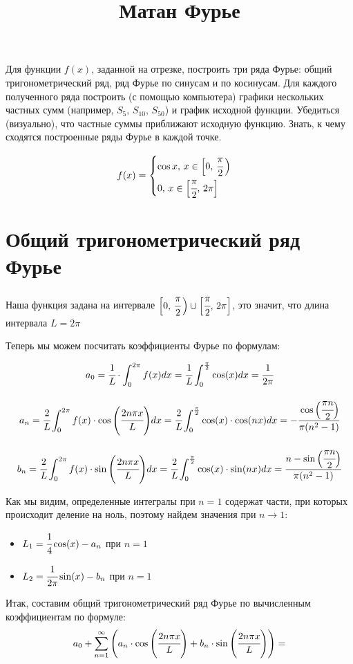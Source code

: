 \documentclass{article}
\title{Матан Фурье}
\begin{document}
\maketitle 
Для функции $f (x)$, заданной на отрезке, построить три ряда Фурье: общий тригонометрический ряд, ряд Фурье по синусам и по косинусам. Для каждого полученного ряда построить (с помощью компьютера) графики нескольких частных сумм (например, $S_5,\,S_{10},\,S_{50}$) и график исходной функции. Убедиться (визуально), что частные суммы приближают исходную функцию. Знать, к чему сходятся построенные ряды Фурье в каждой точке.

$$f(x)=\begin{cases} \cos x,\,x\in \Big[ 0,\,\cfrac{\pi}{2}\,\Big) \\ 0,\,x\in \Big[\cfrac{\pi}{2},\,2\pi\Big] \end{cases}
$$
\tableofcontents
\newpage
\section{Общий тригонометрический ряд Фурье}
Наша функция задана на интервале $\Big[ 0,\,\cfrac{\pi}{2}\,\Big) \cup \Big[\cfrac{\pi}{2},\,2\pi\Big]$, это значит, что длина интервала $L = 2\pi$

Теперь мы можем посчитать коэффициенты Фурье по формулам:

$$ a_0 = \cfrac{1}{L}\cdot \int_{0}^{2\pi} f(x)dx = \cfrac{1}{L} \int_{0}^{\frac{\pi}{2}} \cos(x)dx=\cfrac{1}{2\pi}$$

$$ a_n=\cfrac{2}{L}\int_0^{2\pi} f(x)\cdot\cos\Bigg(\cfrac{2n\pi x}{L}\Bigg)dx= \cfrac{2}{L}\int_0^{\frac{\pi}{2}}\cos(x)\cdot\cos(nx)dx = -\cfrac{\cos\Big(\cfrac{\pi n}{2}\Big)}{\pi (n^2-1)}$$

$$ b_n=\cfrac{2}{L}\int_0^{2\pi} f(x)\cdot\sin\Bigg(\cfrac{2n\pi x}{L}\Bigg)dx= \cfrac{2}{L}\int_0^{\frac{\pi}{2}}\cos(x)\cdot\sin(nx)dx = \cfrac{n-\sin\Big(\cfrac{\pi n}{2}\Big)}{\pi (n^2-1)} $$

Как мы видим, определенные интегралы при $n = 1$ содержат части, при которых происходит деление на ноль, поэтому найдем значения при $n\to1$:
\begin{itemize}
    \item $L_1=\cfrac{1}{4}\cos(x)-a_n$ при $n=1$
    \item $L_2=\cfrac{1}{2\pi}\sin(x)-b_n$ при $n=1$
\end{itemize}
Итак, составим общий тригонометрический ряд Фурье по вычисленным коэффициентам по формуле:
$$ a_0+\sum_{n=1}^{\infty}\Bigg(a_n\cdot\cos\Bigg(\cfrac{2n\pi x}{L}\Bigg) + b_n\cdot\sin\Bigg(\cfrac{2n\pi x}{L}\Bigg)\Bigg) = $$
\end{document}

